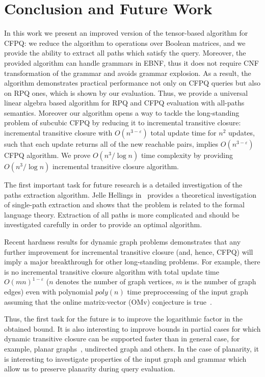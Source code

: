 \section{Conclusion and Future Work}

In this work we present an improved version of the tensor-based algorithm for CFPQ: we reduce the algorithm to operations over Boolean matrices, and we provide the ability to extract all paths which satisfy the query.
Moreover, the provided algorithm can handle grammars in EBNF, thus it does not require CNF transformation of the grammar and avoids grammar explosion.
As a result, the algorithm demonstrates practical performance not only on CFPQ queries but also on RPQ ones, which is shown by our evaluation.
Thus, we provide a universal linear algebra based algorithm for RPQ and CFPQ evaluation with all-paths semantics.
Moreover our algorithm opens a way to tackle the long-standing problem of subcubic CFPQ by reducing it to incremental transitive closure: incremental transitive closure with $O(n^{3-\varepsilon})$ total update time for $n^2$ updates, such that each update returns all of the new reachable pairs, implies $O(n^{3-\varepsilon})$ CFPQ algorithm.
We prove $O(n^3/\log{n})$ time complexity by providing $O(n^3/\log{n})$ incremental transitive closure algorithm.


The first important task for future research is a detailed investigation of the paths extraction algorithm.
Jelle Hellings in~\cite{!!!} provides a theoretical investigation of single-path extraction and shows that the problem is related to the formal language theory.
Extraction of all paths is more complicated and should be investigated carefully in order to provide an optimal algorithm.

Recent hardness results for dynamic graph problems demonstrates that any further improvement for incremental transitive closure (and, hence, CFPQ)  will imply a major breakthrough for other long-standing problems. For example, there is no incremental transitive closure algorithm with total update time $O{(mn)}^{1-\varepsilon}$ ($n$ denotes the number of graph vertices, $m$ is the number of graph edges) even with polynomial $poly(n)$ time preproccessing of the input graph assuming that the online matrix-vector (OMv) conjecture is true~\cite{10.1145/2746539.2746609}.


Thus, the first task for the future is to improve the logarithmic factor in the obtained bound.
It is also interesting to improve bounds in partial cases for which dynamic transitive closure can be supported faster than in general case, for example, planar graphs~\cite{10.1007/3-540-57273-2_72}, undirected graph and others.
In the case of planarity, it is interesting to investigate properties of the input graph and grammar which allow us to preserve planarity during query evaluation.


